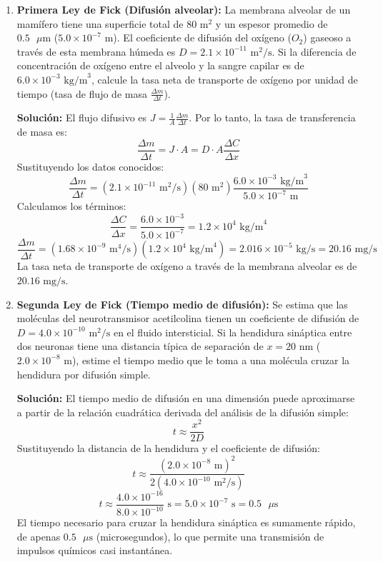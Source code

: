 \documentclass[12pt,letterpaper]{article}
\begin{document}
\begin{enumerate}
    \vspace{0.3cm}
    \item \textbf{Primera Ley de Fick (Difusión alveolar):} La membrana alveolar de un mamífero tiene una superficie total de $80 \text{ m}^2$ y un espesor promedio de $0.5 \text{ }\mu\text{m}$ ($5.0 \times 10^{-7} \text{ m}$). El coeficiente de difusión del oxígeno ($O_2$) gaseoso a través de esta membrana húmeda es $D = 2.1 \times 10^{-11} \text{ m}^2\text{/s}$. Si la diferencia de concentración de oxígeno entre el alveolo y la sangre capilar es de $6.0 \times 10^{-3} \text{ kg/m}^3$, calcule la tasa neta de transporte de oxígeno por unidad de tiempo (tasa de flujo de masa $\frac{\Delta m}{\Delta t}$).
    
    \textbf{Solución:}
    El flujo difusivo es $J = \frac{1}{A} \frac{\Delta m}{\Delta t}$. Por lo tanto, la tasa de transferencia de masa es:
    \[
    \frac{\Delta m}{\Delta t} = J \cdot A = D \cdot A \frac{\Delta C}{\Delta x}
    \]
    Sustituyendo los datos conocidos:
    \[
    \frac{\Delta m}{\Delta t} = (2.1 \times 10^{-11} \text{ m}^2\text{/s})(80 \text{ m}^2) \frac{6.0 \times 10^{-3} \text{ kg/m}^3}{5.0 \times 10^{-7} \text{ m}}
    \]
    Calculamos los términos:
    \[
    \frac{\Delta C}{\Delta x} = \frac{6.0 \times 10^{-3}}{5.0 \times 10^{-7}} = 1.2 \times 10^4 \text{ kg/m}^4
    \]
    \[
    \frac{\Delta m}{\Delta t} = (1.68 \times 10^{-9} \text{ m}^4\text{/s})(1.2 \times 10^4 \text{ kg/m}^4) = 2.016 \times 10^{-5} \text{ kg/s} = 20.16 \text{ mg/s}
    \]
    La tasa neta de transporte de oxígeno a través de la membrana alveolar es de $20.16 \text{ mg/s}$.

    \vspace{0.3cm}
    \item \textbf{Segunda Ley de Fick (Tiempo medio de difusión):} Se estima que las moléculas del neurotransmisor acetilcolina tienen un coeficiente de difusión de $D = 4.0 \times 10^{-10} \text{ m}^2\text{/s}$ en el fluido intersticial. Si la hendidura sináptica entre dos neuronas tiene una distancia típica de separación de $x = 20 \text{ nm}$ ($2.0 \times 10^{-8} \text{ m}$), estime el tiempo medio que le toma a una molécula cruzar la hendidura por difusión simple.
    
    \textbf{Solución:}
    El tiempo medio de difusión en una dimensión puede aproximarse a partir de la relación cuadrática derivada del análisis de la difusión simple:
    \[
    t \approx \frac{x^2}{2D}
    \]
    Sustituyendo la distancia de la hendidura y el coeficiente de difusión:
    \[
    t \approx \frac{(2.0 \times 10^{-8} \text{ m})^2}{2(4.0 \times 10^{-10} \text{ m}^2\text{/s})}
    \]
    \[
    t \approx \frac{4.0 \times 10^{-16}}{8.0 \times 10^{-10}} \text{ s} = 5.0 \times 10^{-7} \text{ s} = 0.5 \text{ }\mu\text{s}
    \]
    El tiempo necesario para cruzar la hendidura sináptica es sumamente rápido, de apenas $0.5 \text{ }\mu\text{s}$ (microsegundos), lo que permite una transmisión de impulsos químicos casi instantánea.


\end{enumerate}
\end{document}
